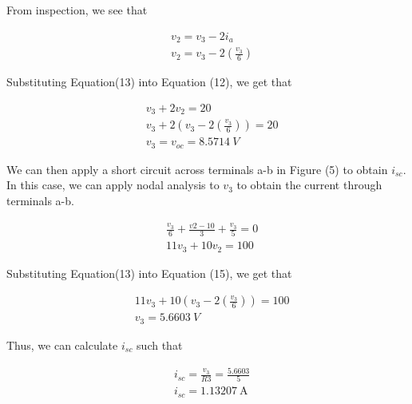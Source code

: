 \documentclass[12pt]{article}
\begin{document}
From inspection, we see that

\begin{equation}
    \begin{split}
        &v_2 = v_3 - 2i_a \\
        &v_2 = v_3 - 2\left(\frac{v_3}{6}\right)
    \end{split}
\end{equation}

Substituting Equation(13) into Equation (12), we get that

\begin{equation}
    \begin{split}
        &v_3 + 2v_2 = 20 \\
        &v_3 + 2\left(v_3 - 2\left(\frac{v_3}{6}\right)\right) = 20 \\
        &v_3 = v_{oc} = \SI{8.5714}{V}
    \end{split}
\end{equation}

We can then apply a short circuit across terminals a-b in Figure (5) to obtain $i_{sc}$. In this case, we can apply nodal analysis to $v_3$ to obtain the current through terminals a-b.

\begin{equation}
    \begin{split}
        &\frac{v_3}{6} + \frac{v2-10}{3} + \frac{v_3}{5} = 0 \\
        &11v_3 + 10v_2 = 100
    \end{split}
\end{equation}

Substituting Equation(13) into Equation (15), we get that

\begin{equation}
    \begin{split}
        &11v_3 + 10\left(v_3 - 2\left(\frac{v_3}{6}\right)\right) = 100 \\
        &v_3 = \SI{5.6603}{V}
    \end{split}
\end{equation}

Thus, we can calculate $i_{sc}$ such that

\begin{equation}
    \begin{split}
        &i_{sc} = \frac{v_3}{R3} = \frac{5.6603}{5} \\
        &i_{sc} = \SI{1.13207}{\ampere}
    \end{split}
\end{equation}
\end{document}
